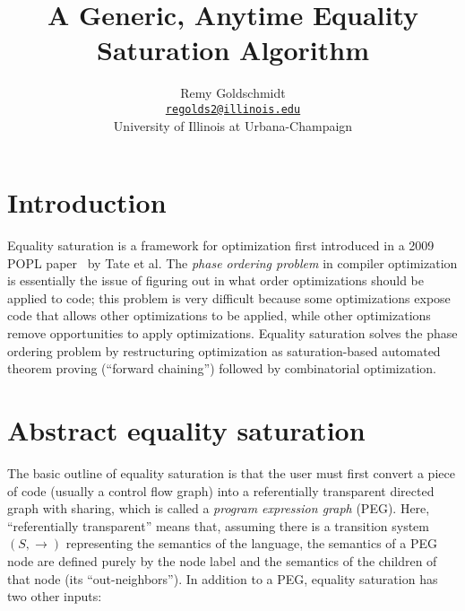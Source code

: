 \documentclass[11pt]{report}
\newcommand{\sfixme}[0]{%
  \begin{minipage}[c]{3.5em}%
  \todo[color=green!40,inline]{\textsc{fixme}}%
  \end{minipage}}
\newcommand{\email}[1]{\href{mailto:#1}{\texttt{#1}}}
\begin{document}
\title{A Generic, Anytime Equality Saturation Algorithm}
\author{%
  Remy Goldschmidt \\
  \email{regolds2@illinois.edu} \\
  University of Illinois at Urbana-Champaign
}

\maketitle{}

\tableofcontents{}
\listoflistings{}


\chapter{Introduction}
\label{sec:introduction}

Equality saturation is a framework for optimization first introduced in
a 2009 POPL paper~\cite{tate-2009} by Tate et al.
The \textit{phase ordering problem} in compiler optimization is essentially
the issue of figuring out in what order optimizations should be applied to code;
this problem is very difficult because some optimizations expose code that
allows other optimizations to be applied, while other optimizations remove
opportunities to apply optimizations. Equality saturation solves the phase
ordering problem by restructuring optimization as saturation-based automated
theorem proving (``forward chaining'') followed by combinatorial optimization.

\sfixme{}


\chapter{Abstract equality saturation}
\label{sec:abstract-eqsat}

The basic outline of equality saturation is that the user must first convert
a piece of code (usually a control flow graph) into a referentially transparent
directed graph with sharing, which is called a \textit{program expression graph}
(PEG)\footnotemark. Here, ``referentially transparent'' means that, assuming
there is a transition system $(S, {\to})$ representing the semantics of the
language, the semantics of a PEG node are defined purely by the node label and
the semantics of the children of that node (its ``out-neighbors''). In addition
to a PEG, equality saturation has two other inputs:
\end{document}
